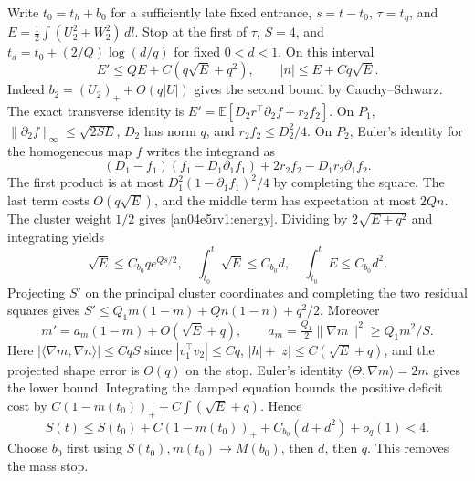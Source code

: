 \documentclass[11pt]{article}
\newcommand{\dd}{\,dl}
\newcommand{\E}{\mathbb E}
\begin{document}
Write $t_0=t_h+b_0$ for a sufficiently late fixed entrance, $s=t-t_0$,
$\tau=t_\eta$, and $E=\tfrac12\int (U_2^2+W_2^2)\dd$. Stop at the first of
$\tau$, $S=4$, and $t_d=t_0+(2/Q)\log(d/q)$ for fixed $0<d<1$.
On this interval
\begin{equation}\label{an04e5rv1:energy}
 E'\le QE+C(q\sqrt E+q^2),\qquad |n|\le E+Cq\sqrt E .
\end{equation}
Indeed $b_2=(U_2)_++O(q|U|)$ gives the second bound by Cauchy--Schwarz.
The exact transverse identity is $E'=\E[D_2r^\top\partial_2 f+r_2 f_2]$.
On $P_1$, $\|\partial_2 f\|_\infty\le\sqrt{2SE}$, $D_2$ has norm $q$, and $r_2 f_2\le D_2^2/4$. On $P_2$, Euler's identity for the homogeneous map $f$ writes the integrand as
\[
 (D_1-f_1)(f_1-D_1\partial_1 f_1)+2r_2 f_2-D_1r_2\partial_1 f_2.
\]
The first product is at most $D_1^2(1-\partial_1 f_1)^2/4$ by completing the square. The last term costs $O(q\sqrt E)$, and the middle term has expectation at most $2Qn$. The cluster weight $1/2$ gives \eqref{an04e5rv1:energy}. Dividing by $2\sqrt{E+q^2}$ and integrating yields
\begin{equation}\label{an04e5rv1:envelope}
 \sqrt E\le C_{b_0}q e^{Qs/2},\quad
 \int_{t_0}^t\sqrt E\le C_{b_0}d,\quad \int_{t_0}^t E\le C_{b_0}d^2 .
\end{equation}
Projecting $S'$ on the principal cluster coordinates and completing the two residual squares gives $S'\le Q_1m(1-m)+Qn(1-n)+q^2/2$. Moreover
\[
 m'=a_m(1-m)+O(\sqrt E+q),\qquad
 a_m=\tfrac{Q_1}2\|\nabla m\|^2\ge Q_1m^2/S.
\]
Here $|\langle\nabla m,\nabla n\rangle|\le Cq S$ since $|v_1^\top v_2|\le Cq$, $|h|+|z|\le C(\sqrt E+q)$, and the projected shape error is $O(q)$ on the stop. Euler's identity $\langle\Theta,\nabla m\rangle=2m$ gives the lower bound. Integrating the damped equation bounds the positive deficit cost by $C(1-m(t_0))_++C\int(\sqrt E+q)$. Hence
\[
 S(t)\le S(t_0)+C(1-m(t_0))_++C_{b_0}(d+d^2)+o_q(1)<4 .
\]
Choose $b_0$ first using $S(t_0),m(t_0)\to M(b_0)$, then $d$, then $q$. This removes the mass stop.
\end{document}
